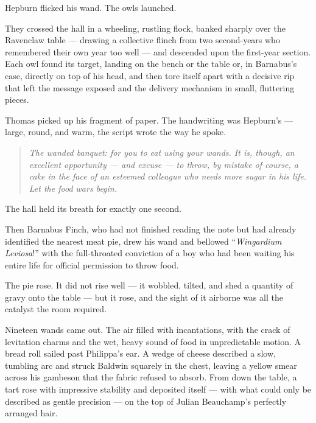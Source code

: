 Hepburn flicked his wand. The owls launched.
 
They crossed the hall in a wheeling, rustling flock, banked sharply over the Ravenclaw table --- drawing a collective flinch from two second-years who remembered their own year too well --- and descended upon the first-year section. Each owl found its target, landing on the bench or the table or, in Barnabus's case, directly on top of his head, and then tore itself apart with a decisive rip that left the message exposed and the delivery mechanism in small, fluttering pieces.
 
Thomas picked up his fragment of paper. The handwriting was Hepburn's --- large, round, and warm, the script   wrote the way he spoke.
 
\begin{quote}
\textit{The wanded banquet: for you to eat using your wands. It is, though, an excellent opportunity --- and excuse --- to throw, by mistake of course, a cake in the face of an esteemed colleague who needs more sugar in his life. Let the food wars begin.}
\end{quote}
 
The hall held its breath for exactly one second.
 
Then Barnabus Finch, who had not finished reading the note but had already identified the nearest meat pie, drew his wand and bellowed \enquote{\textit{Wingardium Leviosa}!} with the full-throated conviction of a boy who had been waiting his entire life for official permission to throw food.
 
The pie rose. It did not rise well --- it wobbled, tilted, and shed a quantity of gravy onto the table --- but it rose, and the sight of it airborne was all the catalyst the room required.
 
Nineteen wands came out. The air filled with incantations, with the crack of levitation charms and the wet, heavy sound of food in unpredictable motion. A bread roll sailed past Philippa's ear. A wedge of cheese described a slow, tumbling arc and struck Baldwin squarely in the chest, leaving a yellow smear across his gambeson that the fabric refused to absorb. From down the table, a tart rose with impressive stability and deposited itself --- with what could only be described as gentle precision --- on the top of Julian Beauchamp's perfectly arranged hair.
 


